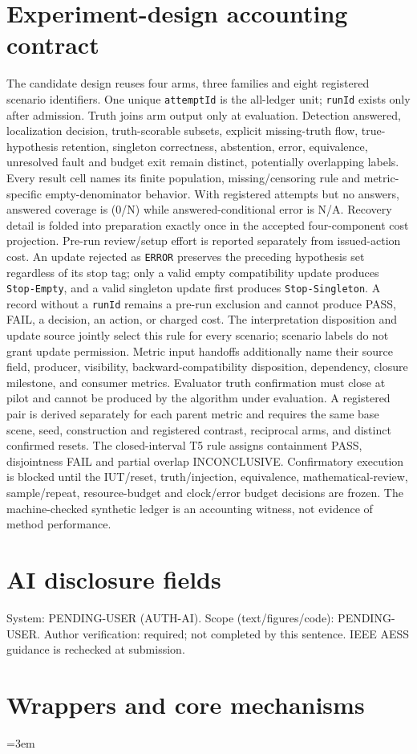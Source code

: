 \documentclass[11pt,letterpaper]{article}
\begin{document}
\section{Experiment-design accounting contract}
The candidate design reuses four arms, three families and eight registered
scenario identifiers. One unique \texttt{attemptId} is the all-ledger unit;
\texttt{runId} exists only after admission. Truth joins arm output only at
evaluation. Detection answered, localization decision, truth-scorable subsets,
explicit missing-truth flow, true-hypothesis
retention, singleton correctness, abstention, error, equivalence, unresolved
fault and budget exit remain distinct, potentially overlapping labels. Every
result cell names its finite population, missing/censoring rule and
metric-specific empty-denominator behavior. With registered attempts but no
answers, answered coverage is (0/N) while answered-conditional error is N/A.
Recovery detail is folded into preparation exactly once in the accepted
four-component cost projection.
Pre-run review/setup effort is reported separately from issued-action cost.
An update rejected as \texttt{ERROR} preserves the preceding hypothesis set
regardless of its stop tag; only a valid empty compatibility update produces
\texttt{Stop-Empty}, and a valid singleton update first produces
\texttt{Stop-Singleton}. A record without a \texttt{runId} remains a pre-run
exclusion and cannot produce PASS, FAIL, a decision, an action, or charged cost.
The interpretation disposition and update source jointly select this rule for
every scenario; scenario labels do not grant update permission. Metric input
handoffs additionally name their source field, producer, visibility,
backward-compatibility disposition, dependency, closure milestone, and consumer
metrics. Evaluator truth confirmation must close at pilot and cannot be produced
by the algorithm under evaluation.
A registered pair is derived separately for each parent
metric and requires the same base scene, seed, construction and registered
contrast, reciprocal arms, and distinct confirmed resets. The closed-interval T5 rule assigns containment PASS,
disjointness FAIL and partial overlap INCONCLUSIVE.
Confirmatory execution is blocked until the IUT/reset, truth/injection,
equivalence, mathematical-review, sample/repeat, resource-budget and clock/error
budget decisions are frozen.
The machine-checked synthetic ledger is an accounting witness, not evidence of
method performance.

\section{AI disclosure fields}
System: PENDING-USER (AUTH-AI). Scope (text/figures/code): PENDING-USER.
Author verification: required; not completed by this sentence. IEEE AESS
guidance is rechecked at submission.

\section{Wrappers and core mechanisms}
\sloppy
\emergencystretch=3em
{\normalsize
\SetAlFnt{\normalsize}
\setlength{\algomargin}{0pt}






}
\end{document}

